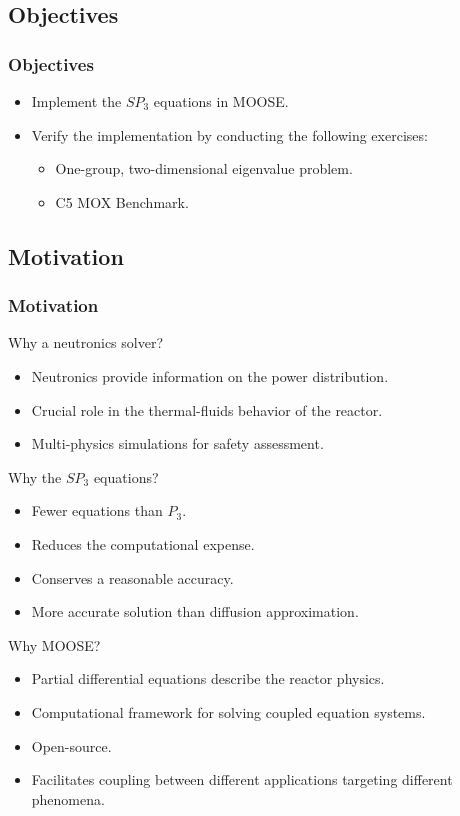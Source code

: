 \subsection{Objectives}

\begin{frame}
\frametitle{Objectives}
  \begin{itemize}
    \item Implement the $SP_3$ equations in MOOSE.
    \item Verify the implementation by conducting the following exercises:
      \begin{itemize}
        \item One-group, two-dimensional eigenvalue problem.
        \item C5 MOX Benchmark.
  	  \end{itemize}
  \end{itemize}
\end{frame}


\subsection{Motivation}

\begin{frame}
\frametitle{Motivation}
  
  Why a neutronics solver?
  \begin{itemize}
    \item Neutronics provide information on the power distribution.
    \item Crucial role in the thermal-fluids behavior of the reactor.
    \item Multi-physics simulations for safety assessment.
  \end{itemize}

  Why the $SP_3$ equations?
  \begin{itemize}
    \item Fewer equations than $P_3$.
    \item Reduces the computational expense.
    \item Conserves a reasonable accuracy.
    \item More accurate solution than diffusion approximation.
  \end{itemize}
  
  Why MOOSE?
  \begin{itemize}
    \item Partial differential equations describe the reactor physics.
    \item Computational framework for solving coupled equation systems.
    \item Open-source.
    \item Facilitates coupling between different applications targeting different phenomena.
  \end{itemize}

\end{frame}
